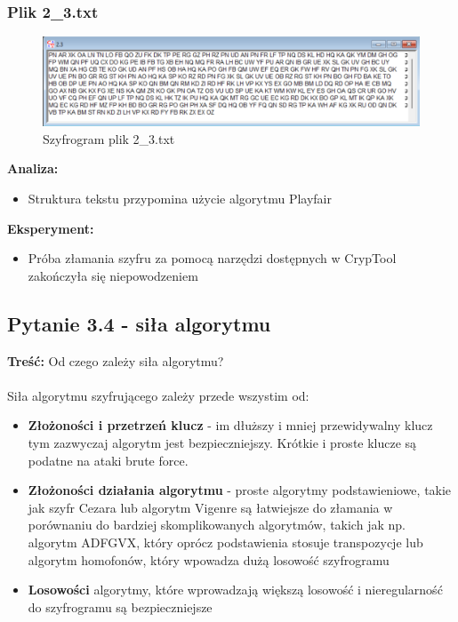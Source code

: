 \documentclass{article}
\begin{document}
\subsubsection*{Plik 2\_3.txt}
\begin{figure}[H]
    \centering
    \includegraphics[width=\textwidth]{2_3.png}
    \caption{Szyfrogram plik 2\_3.txt}
\end{figure}
\textbf{Analiza: }
\begin{itemize}
    \item Struktura tekstu przypomina użycie algorytmu Playfair
\end{itemize}
\textbf{Eksperyment: }
\begin{itemize}
    \item Próba złamania szyfru za pomocą narzędzi dostępnych w CrypTool zakończyła się niepowodzeniem
\end{itemize}

\subsection*{Pytanie 3.4 - siła algorytmu}
\textbf{Treść:} Od czego zależy siła algorytmu? \\\\
Siła algorytmu szyfrującego zależy przede wszystim od:
\begin{itemize}
    \item \textbf{Złożoności i przetrzeń klucz} - im dłuższy i mniej przewidywalny klucz tym zazwyczaj algorytm jest bezpieczniejszy. Krótkie i proste klucze są podatne na
    ataki brute force.
    \item \textbf{Złożoności działania algorytmu} - proste algorytmy podstawieniowe, takie jak szyfr Cezara lub algorytm Vigenre są łatwiejsze do złamania
    w porównaniu do bardziej skomplikowanych algorytmów, takich jak np. algorytm ADFGVX, który oprócz podstawienia stosuje transpozycje lub algorytm homofonów,
    który wpowadza dużą losowość szyfrogramu
    \item \textbf{Losowości} algorytmy, które wprowadzają większą losowość i nieregularność do szyfrogramu są bezpieczniejsze
\end{itemize}
\end{document}
